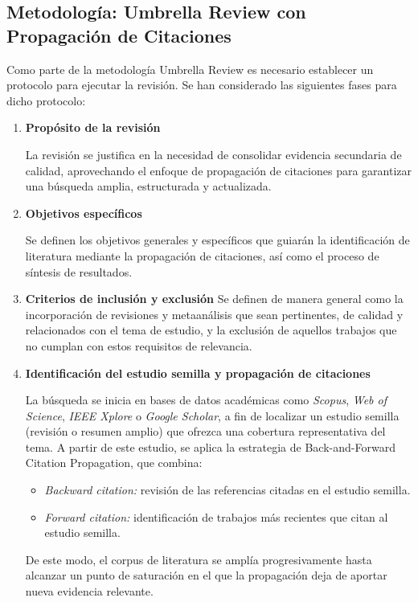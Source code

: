 \subsection*{Metodología: Umbrella Review con Propagación de Citaciones}
Como parte de la metodología Umbrella Review es necesario establecer un protocolo para ejecutar la revisión.
Se han considerado las siguientes fases para dicho protocolo:
\begin{enumerate}
    \item \textbf{Propósito de la revisión}  
    
    La revisión se justifica en la necesidad de consolidar evidencia secundaria de calidad, aprovechando el enfoque de propagación de citaciones 
    para garantizar una búsqueda amplia, estructurada y actualizada.

    \item \textbf{Objetivos específicos}  

    Se definen los objetivos generales y específicos que guiarán la identificación de literatura mediante la propagación de citaciones, 
    así como el proceso de síntesis de resultados.

    \item \textbf{Criterios de inclusión y exclusión}  
    Se definen de manera general como la incorporación de revisiones y metaanálisis que sean pertinentes, de calidad y relacionados con el tema de estudio, 
    y la exclusión de aquellos trabajos que no cumplan con estos requisitos de relevancia.
    
    \item \textbf{Identificación del estudio semilla y propagación de citaciones}  
    
    La búsqueda se inicia en bases de datos académicas como \textit{Scopus}, \textit{Web of Science}, \textit{IEEE Xplore} o \textit{Google Scholar}, a fin de localizar 
    un estudio semilla (revisión o resumen amplio) que ofrezca una cobertura representativa del tema.  
    A partir de este estudio, se aplica la estrategia de Back-and-Forward Citation Propagation, que combina:  
    \begin{itemize}
        \item \textit{Backward citation:} revisión de las referencias citadas en el estudio semilla.  
        \item \textit{Forward citation:} identificación de trabajos más recientes que citan al estudio semilla.  
    \end{itemize}
    De este modo, el corpus de literatura se amplía progresivamente hasta alcanzar un punto de saturación en el que la propagación deja de aportar nueva evidencia relevante.


\end{enumerate}
